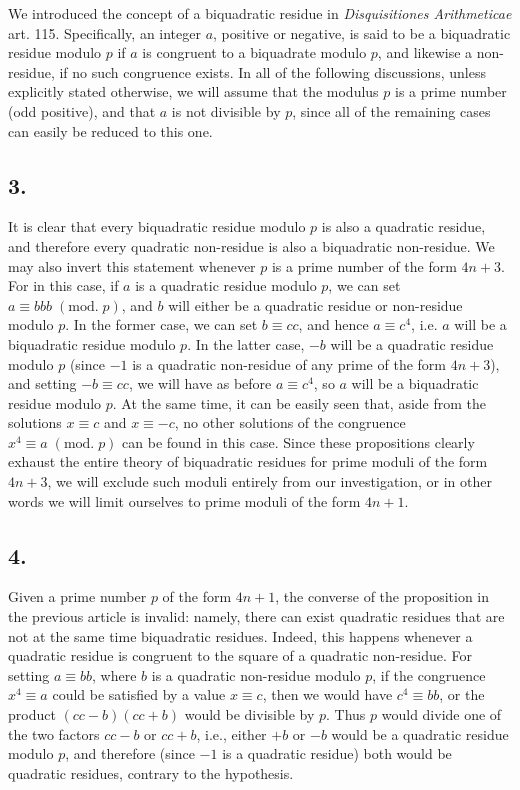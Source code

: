 \documentclass[twoside,12pt]{memoir}
\renewcommand{\pmod}[1]{\;(\textrm{mod.}\;#1)}
\begin{document}
We introduced the concept of a biquadratic residue in \textit{Disquisitiones Arithmeticae} art. 115.  Specifically, an integer \(a\), positive or negative, is said to be a biquadratic residue modulo \(p\) if \(a\) is congruent to a biquadrate modulo \(p\), and likewise a non-residue, if no such congruence exists. In all of the following discussions, unless explicitly stated otherwise, we will assume that the modulus \(p\) is a prime number (odd positive), and that \(a\) is not divisible by \(p\), since all of the remaining cases can easily be reduced to this one.

\subsection*{3.}

It is clear that every biquadratic residue modulo \(p\) is also a quadratic residue, and therefore every quadratic non-residue  is also a biquadratic non-residue. We may also invert this statement whenever \(p\) is a prime number of the form \(4n+3\). For in this case, if \(a\) is a quadratic residue modulo \(p\), we can set \(a \equiv bbb \pmod{p}\), and \(b\) will either be a quadratic residue or non-residue modulo \(p\). In the former case, we can set \(b \equiv c c\), and hence \(a \equiv c^{4}\), i{.}e{.} \(a\) will be a biquadratic residue modulo \(p\).  In the latter case, \(-b\) will be a quadratic residue modulo \(p\) (since \(-1\) is a quadratic non-residue of any prime of the form \(4n+3\)), and setting \(-b \equiv c c\), we will have as before \(a \equiv c^{4}\), so \(a\) will be a biquadratic residue modulo \(p\). At the same time, it can be easily seen that, aside from the solutions \(x \equiv c\) and \(x \equiv -c\), no other solutions of the congruence \(x^4 \equiv a \pmod{p}\) can be found in this case. Since these propositions clearly exhaust the entire theory of biquadratic residues for prime moduli of the form \(4n+3\), we will exclude such moduli entirely from our investigation, or in other words we will limit ourselves to prime moduli of the form \(4n+1\).

\subsection*{4.}

Given a prime number \(p\) of the form \(4n+1\), the converse of the proposition in the previous article is invalid: namely, there can exist quadratic residues that are not at the same time biquadratic residues.  Indeed, this happens whenever a quadratic residue is congruent to the square of a quadratic non-residue. For setting \(a \equiv bb\), where \(b\) is \pagebreak%
a quadratic non-residue modulo \(p\), if the congruence \(x^4 \equiv a\) could be satisfied by a value \(x \equiv c\), then we would have \(c^4 \equiv bb\), or the product \((cc-b)(cc+b)\) would be divisible by \(p\).  Thus \(p\) would divide one of the two factors \(cc-b\) or \(cc+b\), i{.}e{.}, either \(+b\) or \(-b\) would be a quadratic residue modulo \(p\), and therefore (since \(-1\) is a quadratic residue) both would be quadratic residues, contrary to the hypothesis.
 
\end{document}

